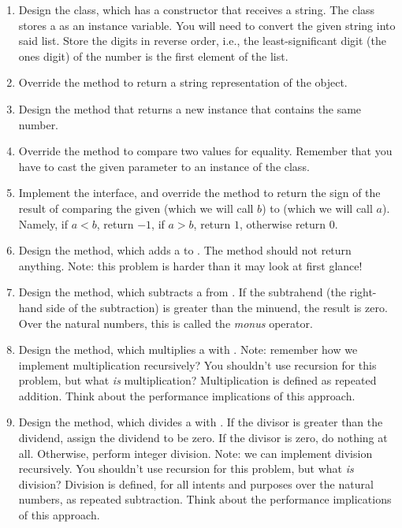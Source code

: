 \begin{enumerate}[label=(\alph*)]
    \item Design the  class, which has a constructor that receives a string. The  class stores a  as an instance variable. You will need to convert the given string into said list. Store the digits in reverse order, i.e., the least-significant digit (the ones digit) of the number is the first element of the list.
    \item Override the  method to return a string representation of the  object. 
    \item Design the  method that returns a new  instance that contains the same number.
    \item Override the  method to compare two  values for equality. Remember that you have to cast the given parameter to an instance of the  class. 
    \item Implement the  interface, and override the  method to return the sign of the result of comparing the given  (which we will call $b$) to   (which we will call $a$). Namely, if $a < b$, return $-1$, if $a > b$, return $1$, otherwise return $0$.
    \item Design the  method, which adds a  to  . The method should not return anything. Note: this problem is harder than it may look at first glance!
    \item Design the  method, which subtracts a  from  . If the subtrahend (the right-hand side of the subtraction) is greater than the minuend, the result is zero. Over the natural numbers, this is called the \emph{monus} operator.
    \item Design the  method, which multiplies a  with  . Note: remember how we implement multiplication recursively? You shouldn't use recursion for this problem, but what \emph{is} multiplication? Multiplication is defined as repeated addition. Think about the performance implications of this approach.
    \item Design the  method, which divides a  with  . If the divisor is greater than the dividend, assign the dividend to be zero. If the divisor is zero, do nothing at all. Otherwise, perform integer division. Note: we can implement division recursively. You shouldn't use recursion for this problem, but what \emph{is} division? Division is defined, for all intents and purposes over the natural numbers, as repeated subtraction. Think about the performance implications of this approach.
\end{enumerate}

